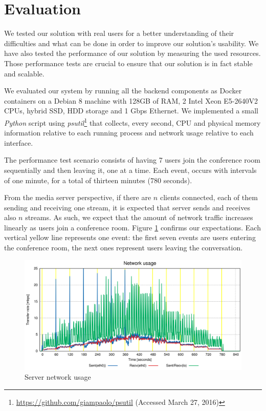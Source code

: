 \documentclass[10pt,conference]{IEEEtran}
\begin{document}
\section{Evaluation}
\label{chapter:evaluation}


We tested our solution with real users for a better understanding of their difficulties and what can be done in order to improve our solution's usability.
We have also tested the performance of our solution by measuring the used resources.
Those performance tests are crucial to ensure that our solution is in fact stable and scalable.

We evaluated our system by running all the backend components as Docker containers on a Debian 8 machine with 128GB of RAM, 2 Intel Xeon E5-2640V2 CPUs, hybrid SSD, HDD storage and 1 Gbps Ethernet. 
We implemented a small \emph{Python} script using \emph{psutil}\footnote{\url{https://github.com/giampaolo/psutil} (Accessed March 27, 2016)} that collects, every second, CPU and physical memory information relative to each running process and network usage relative to each interface. 

The performance test scenario consists of having 7 users join the conference room sequentially and then leaving it, one at a time.
Each event, occurs with intervals of one minute, for a total of thirteen minutes (780 seconds).
  
From the media server perspective, if there are $n$ clients connected, each of them sending and receiving one stream, it is expected that server sends and receives also $n$ streams.
As such, we expect that the amount of network traffic increases linearly as users join a conference room.
Figure \ref{fig:test_full_features_net} confirms our expectations.
Each vertical yellow line represents one event: the first seven events are users entering the conference room, the next ones represent users leaving the conversation. 
     

\begin{figure}
  \centering
\includegraphics[width=\linewidth]{net_usage.png}
  \caption{Server network usage}
  \label{fig:test_full_features_net}
\end{figure}
\end{document}
